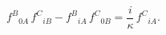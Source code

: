 \begin{equation}\label{32}
f^{B}{}_{0 A}\, f^{C}{}_{i B}-f^{B}{}_{i A}\, f^{C}{}_{0 B} =\frac{i}\kappa\,
f^{C}{}_{i A}.
\end{equation}

